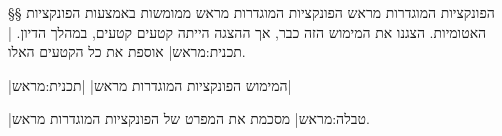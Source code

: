 §§ הפונקציות המוגדרות מראש
הפונקציות המוגדרות מראש ממומשות באמצעות הפונקציות האטומיות. הצגנו את המימוש הזה
כבר, אך ההצגה הייתה קטעים קטעים, במהלך הדיון. |תכנית:מראש| אוספת את כל הקטעים האלו. 

\begin{תכנית}[H]
\immediate\closeout \libraryFile
\begin{LTR}
   
\end{LTR}
|המימוש הפונקציות המוגדרות מראש|
|תכנית:מראש|
\end{תכנית}

|טבלה:מראש| מסכמת את המפרט של הפונקציות המוגדרות מראש.

